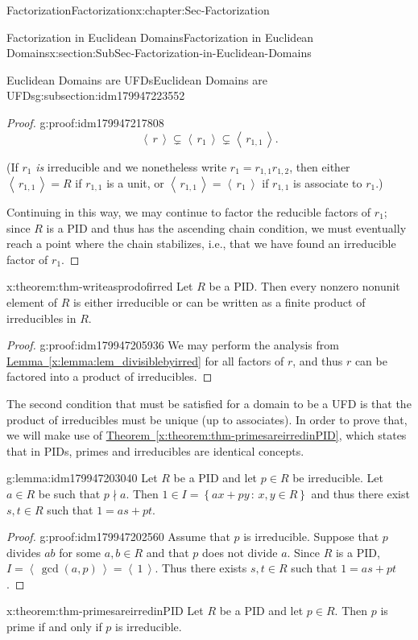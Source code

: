 \documentclass[oneside,10pt,]{book}
\newcommand{\xreffont}{\relax}
\numberwithin{equation}{section}
\newcommand{\ideal}[1]{\left\langle\, #1 \,\right\rangle}
\newcommand{\setof}[2]{{\left\{#1\,\colon\,#2\right\}}}
\begin{document}
\begin{chapterptx}{Factorization}{}{Factorization}{}{}{x:chapter:Sec-Factorization}
\begin{sectionptx}{Factorization in Euclidean Domains}{}{Factorization in Euclidean Domains}{}{}{x:section:SubSec-Factorization-in-Euclidean-Domains}
\begin{subsectionptx}{Euclidean Domains are UFDs}{}{Euclidean Domains are UFDs}{}{}{g:subsection:idm179947223552}
\begin{proof}{}{g:proof:idm179947217808}
\begin{equation*}
\ideal{r} \subsetneq \ideal{r_1}\subsetneq \ideal{r_{1,1}}\text{.}
\end{equation*}
%
\par
(If \(r_1\) \emph{is} irreducible and we nonetheless write \(r_1 = r_{1,1} r_{1,2}\), then either \(\ideal{r_{1,1}} = R\) if \(r_{1,1}\) is a unit, or \(\ideal{r_{1,1}} = \ideal{r_1}\) if \(r_{1,1}\) is associate to \(r_1\).)%
\par
Continuing in this way, we may continue to factor the reducible factors of \(r_1\); since \(R\) is a PID and thus has the ascending chain condition, we must eventually reach a point where the chain stabilizes, i.e., that we have found an irreducible factor of \(r_1\).%
\end{proof}
\begin{theorem}{}{}{x:theorem:thm-writeasprodofirred}%
Let \(R\) be a PID. Then every nonzero nonunit element of \(R\) is either irreducible or can be written as a finite product of irreducibles in \(R\).%
\end{theorem}
\begin{proof}{}{g:proof:idm179947205936}
We may perform the analysis from \hyperref[x:lemma:lem_divisiblebyirred]{Lemma~{\xreffont\ref{x:lemma:lem_divisiblebyirred}}} for all factors of \(r\), and thus \(r\) can be factored into a product of irreducibles.%
\end{proof}
The second condition that must be satisfied for a domain to be a UFD is that the product of irreducibles must be unique (up to associates). In order to prove that, we will make use of \hyperref[x:theorem:thm-primesareirredinPID]{Theorem~{\xreffont\ref{x:theorem:thm-primesareirredinPID}}}, which states that in PIDs, primes and irreducibles are identical concepts.%
\begin{lemma}{}{}{g:lemma:idm179947203040}%
Let \(R\) be a PID and let \(p\in R\) be irreducible. Let \(a\in R\) be such that \(p\nmid a\). Then \(1\in I = \setof{ax+py}{x,y\in R}\) and thus there exist \(s,t\in R\) such that \(1 = as+pt\).%
\end{lemma}
\begin{proof}{}{g:proof:idm179947202560}
Assume that \(p\) is irreducible. Suppose that \(p\) divides \(ab\) for some \(a,b \in R\) and that \(p\) does not divide \(a\). Since \(R\) is a PID, \(I = \ideal{\gcd(a,p)} = \ideal{1}\). Thus there exists \(s,t\in R\) such that \(1=as+pt\).%
\end{proof}
\begin{theorem}{}{}{x:theorem:thm-primesareirredinPID}%
Let \(R\) be a PID and let \(p\in R\). Then \(p\) is prime if and only if \(p\) is irreducible.%

\end{theorem}
\end{subsectionptx}
\end{sectionptx}
\end{chapterptx}
\end{document}
